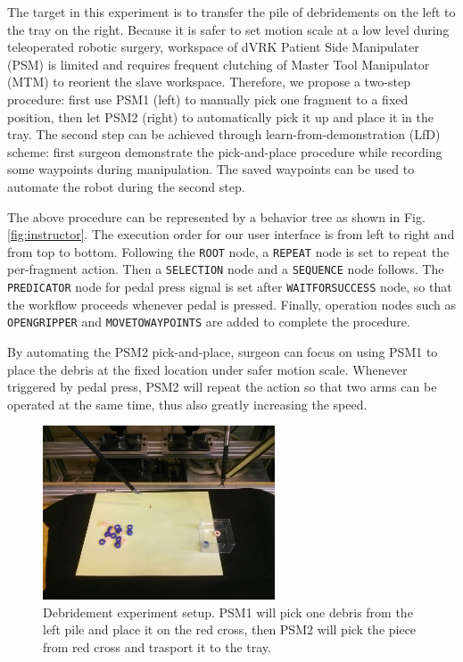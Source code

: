 \documentclass[letterpaper, 10 pt, conference]{ieeeconf}
\begin{document}
The target in this experiment is to transfer the pile of debridements  on the left to the tray on the right. Because it is safer to set motion scale at a low level during teleoperated robotic surgery, workspace of dVRK Patient Side Manipulater (PSM) is limited and requires frequent clutching of Master Tool Manipulator (MTM) to reorient the slave workspace. Therefore, we propose a two-step procedure: first use PSM1 (left) to manually pick one fragment to a fixed position, then let PSM2 (right) to automatically pick it up and place it in the tray. The second step can be achieved through learn-from-demonstration (LfD) scheme: first surgeon demonstrate the pick-and-place procedure while recording some waypoints during manipulation. The saved waypoints can be used to automate the robot during the second step. 

The above procedure can be represented by a behavior tree as shown in Fig. \ref{fig:instructor}. The execution order for our user interface is from left to right and from top to bottom. Following the \texttt{ROOT} node, a \texttt{REPEAT} node is set to repeat the per-fragment action. Then a \texttt{SELECTION} node and a \texttt{SEQUENCE} node follows. The \texttt{PREDICATOR} node for pedal press signal is set after \texttt{WAITFORSUCCESS} node, so that the workflow proceeds whenever pedal is pressed. Finally, operation nodes such as \texttt{OPENGRIPPER} and \texttt{MOVETOWAYPOINTS} are added to complete the procedure. 

By automating the PSM2 pick-and-place, surgeon can focus on using PSM1 to place the debris at the fixed location under safer motion scale. Whenever triggered by pedal press, PSM2 will repeat the action so that two arms can be operated at the same time, thus also greatly increasing the speed.  


\begin{figure}[bt]
\centering
\includegraphics[width=195pt]{debridement.jpg}
\caption{Debridement experiment setup. PSM1 will pick one debris from the left pile and place it on the red cross, then PSM2 will pick the piece from red cross and trasport it to the tray.}
\label{fig:debridement}
\end{figure}
\end{document}
